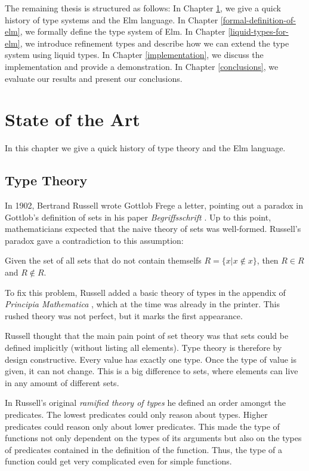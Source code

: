 \documentclass[]{scrbook}
\theoremstyle{definition}
\theoremstyle{definition}
\theoremstyle{definition}
\theoremstyle{remark}
\let\BeginKnitrBlock\begin \let\EndKnitrBlock\end
\begin{document}
The remaining thesis is structured as follows: In Chapter
\ref{state-of-the-art}, we give a quick history of type systems and the
Elm language. In Chapter \ref{formal-definition-of-elm}, we formally
define the type system of Elm. In Chapter \ref{liquid-types-for-elm}, we
introduce refinement types and describe how we can extend the type
system using liquid types. In Chapter \ref{implementation}, we discuss
the implementation and provide a demonstration. In Chapter
\ref{conclusions}, we evaluate our results and present our conclusions.

\chapter{State of the Art}\label{state-of-the-art}

In this chapter we give a quick history of type theory and the Elm
language.

\section{Type Theory}\label{type-theory}

In 1902, Bertrand Russell wrote Gottlob Frege a letter, pointing out a
paradox in Gottlob's definition of sets in his paper
\emph{Begriffsschrift} \autocite{Frege}. Up to this point,
mathematicians expected that the naive theory of sets was well-formed.
Russell's paradox gave a contradiction to this assumption:

\BeginKnitrBlock{theorem}[Russell's Paradox]
\protect\hypertarget{thm:unnamed-chunk-1}{}{\label{thm:unnamed-chunk-1}
{} }Given the set of all sets that do
not contain themselfs \(R = \{x|x\not \in x\}\), then \(R\in R\) and
\(R\not\in R\).
\EndKnitrBlock{theorem}

To fix this problem, Russell added a basic theory of types in the
appendix of \emph{Principia Mathematica}
\autocite{Principia_Mathematica}, which at the time was already in the
printer. This rushed theory was not perfect, but it marks the first
appearance.

Russell thought that the main pain point of set theory was that sets
could be defined implicitly (without listing all elements). Type theory
is therefore by design constructive. Every value has exactly one type.
Once the type of value is given, it can not change. This is a big
difference to sets, where elements can live in any amount of different
sets.

In Russell's original \emph{ramified theory of types}
\autocite{modern_perspective_on_type_theory} he defined an order amongst
the predicates. The lowest predicates could only reason about types.
Higher predicates could reason only about lower predicates. This made
the type of functions not only dependent on the types of its arguments
but also on the types of predicates contained in the definition of the
function. Thus, the type of a function could get very complicated even
for simple functions.
\end{document}
